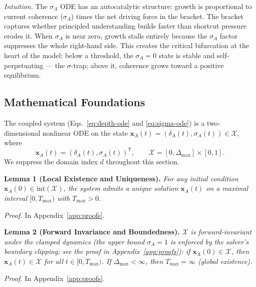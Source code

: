 \documentclass{article}
\theoremstyle{definition}
\begin{document}
\noindent\textit{Intuition.} The $\sigma_A$ ODE has an autocatalytic
structure: growth is proportional to current coherence ($\sigma_A$)
times the net driving force in the bracket. The bracket captures whether
principled understanding builds faster than shortcut pressure erodes it.
When $\sigma_A$ is near zero, growth stalls entirely because the
$\sigma_A$ factor suppresses the whole right-hand side. This creates the
critical bifurcation at the heart of the model: below a threshold, the
$\sigma_A = 0$ state is stable and self-perpetuating --- the
$\sigma$-trap; above it, coherence grows toward a positive equilibrium.

\subsection{Mathematical Foundations}\label{sec:math-foundations}

The coupled system (Eqs.~\eqref{eq:depth-ode} and \eqref{eq:sigma-ode})
is a two-dimensional nonlinear ODE on the state
$\mathbf{x}_A(t) = (\delta_A(t), \sigma_A(t)) \in \mathcal{X}$, where
\begin{equation}\label{eq:state-vector}
\mathbf{x}_A(t) = (\delta_A(t), \sigma_A(t))^{\mathsf{T}},
\qquad
\mathcal{X} = [0, \Delta_{\max}] \times [0, 1].
\end{equation}
We suppress the domain index $d$ throughout this section.

\textbf{Lemma 1 (Local Existence and Uniqueness).}
\emph{For any initial condition $\mathbf{x}_A(0) \in \text{int}(\mathcal{X})$,
the system admits a unique solution $\mathbf{x}_A(t)$ on a maximal
interval $[0, T_{\max})$ with $T_{\max} > 0$.}

\emph{Proof.} In Appendix~\ref{app:proofs}.

\textbf{Lemma 2 (Forward Invariance and Boundedness).}
\emph{$\mathcal{X}$ is forward-invariant under the clamped dynamics
(the upper bound $\sigma_A = 1$ is enforced by the solver's boundary
clipping; see the proof in Appendix~\ref{app:proofs}): if
$\mathbf{x}_A(0) \in \mathcal{X}$, then $\mathbf{x}_A(t) \in \mathcal{X}$
for all $t \in [0, T_{\max})$. If $\Delta_{\max} < \infty$, then
$T_{\max} = \infty$ (global existence).}

\emph{Proof.} In Appendix~\ref{app:proofs}.
\end{document}
